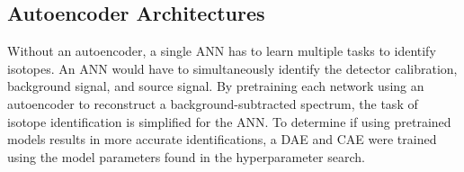 
\subsection{Autoencoder Architectures} \label{section_autoencoder_archetectures}

Without an autoencoder, a single ANN has to learn multiple tasks to identify isotopes. An ANN would have to simultaneously identify the detector calibration, background signal, and source signal. By pretraining each network using an autoencoder to reconstruct a background-subtracted spectrum, the task of isotope identification is simplified for the ANN. To determine if using pretrained models results in more accurate identifications, a DAE and CAE were trained using the model parameters found in the hyperparameter search.

